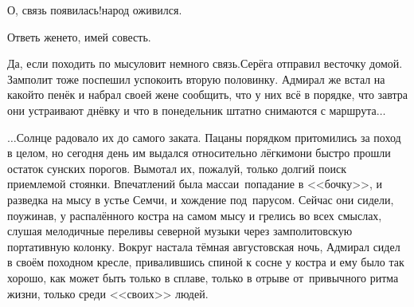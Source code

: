 \diagdash О, связь появилась!\mdash народ оживился.

\diagdash Ответь жене\sdash то, имей совесть.

\diagdash Да, если походить по мысу\mdash ловит немного связь.\mdash Серёга отправил весточку домой. Замполит тоже поспешил успокоить вторую половинку. Адмирал же встал на какой\sdash то пенёк и набрал своей жене сообщить, что у них всё в порядке, что завтра они устраивают днёвку и что в понедельник штатно снимаются с маршрута$\ldots$

\vspace{0.5cm}
$\ldots$Солнце радовало их до самого заката. Пацаны порядком притомились за поход в целом, но сегодня день им выдался относительно лёгким\mdash они быстро прошли остаток сунских порогов. Вымотал их, пожалуй, только долгий поиск приемлемой стоянки. Впечатлений была масса\mdash и~попадание в <<бочку>>, и разведка на мысу в устье Семчи, и хождение под~парусом. Сейчас они сидели, поужинав, у распалённого костра на самом мысу и грелись во всех смыслах, слушая мелодичные переливы северной музыки через замполитовскую портативную колонку. Вокруг настала тёмная августовская ночь, Адмирал сидел в своём походном кресле, привалившись спиной к сосне у костра и ему было так хорошо, как может быть только в сплаве, только в отрыве от~привычного ритма жизни, только среди <<своих>> людей.








\begin{center}
\end{center}
